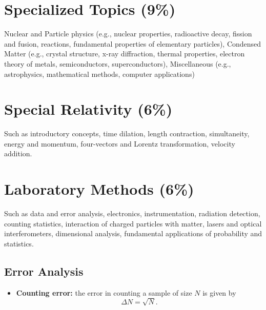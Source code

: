 \documentclass[%
 reprint,
superscriptaddress,
 amsmath,amssymb,
 aps,
prc,
]{revtex4-1}
\begin{document}
\section{Specialized Topics (9\%)}
Nuclear and Particle physics (e.g., nuclear properties, radioactive decay, fission and fusion, reactions, fundamental properties of elementary particles), Condensed Matter (e.g., crystal structure, x-ray diffraction, thermal properties, electron theory of metals, semiconductors, superconductors), Miscellaneous (e.g., astrophysics, mathematical methods, computer applications)

\section{Special Relativity (6\%)}
Such as introductory concepts, time dilation, length contraction, simultaneity, energy and momentum, four-vectors and Lorentz transformation, velocity addition.

\section{Laboratory Methods (6\%)}
Such as data and error analysis, electronics, instrumentation, radiation detection, counting statistics, interaction of charged particles with matter, lasers and optical interferometers, dimensional analysis, fundamental applications of probability and statistics.

\subsection{Error Analysis}
\begin{itemize}
	\item \textbf{Counting error:} the error in counting a sample of size $N$ is given by
	\begin{equation}
		\Delta N = \sqrt{N}.
	\end{equation}
\end{itemize}
\end{document}
